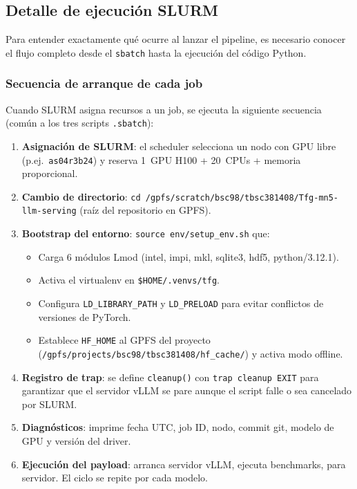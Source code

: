 \documentclass[11pt,a4paper]{article}
\begin{document}
\subsection{Detalle de ejecuci\'on SLURM}
\label{sec:slurm-detail}

Para entender exactamente qu\'e ocurre al lanzar el pipeline, es
necesario conocer el flujo completo desde el \texttt{sbatch} hasta la
ejecuci\'on del c\'odigo Python.

\subsubsection{Secuencia de arranque de cada job}

Cuando SLURM asigna recursos a un job, se ejecuta la siguiente
secuencia (com\'un a los tres scripts \texttt{.sbatch}):

\begin{enumerate}
  \item \textbf{Asignaci\'on de SLURM}: el scheduler selecciona un nodo
    con GPU libre (p.ej.~\texttt{as04r3b24}) y reserva 1~GPU H100 +
    20~CPUs + memoria proporcional.
  \item \textbf{Cambio de directorio}: \texttt{cd /gpfs/scratch/bsc98/\-tbsc381408/\-Tfg-mn5-llm-serving} (ra\'iz del repositorio en GPFS).
  \item \textbf{Bootstrap del entorno}: \texttt{source env/setup\_env.sh}
    que:
    \begin{itemize}
      \item Carga 6 m\'odulos Lmod (intel, impi, mkl, sqlite3, hdf5,
        python/3.12.1).
      \item Activa el virtualenv en \texttt{\$HOME/.venvs/tfg}.
      \item Configura \texttt{LD\_LIBRARY\_PATH} y \texttt{LD\_PRELOAD}
        para evitar conflictos de versiones de PyTorch.
      \item Establece \texttt{HF\_HOME} al GPFS del proyecto
        (\texttt{/gpfs/projects/bsc98/tbsc381408/hf\_cache/}) y activa
        modo offline.
    \end{itemize}
  \item \textbf{Registro de trap}: se define \texttt{cleanup()} con
    \texttt{trap cleanup EXIT} para garantizar que el servidor vLLM se
    pare aunque el script falle o sea cancelado por SLURM.
  \item \textbf{Diagn\'osticos}: imprime fecha UTC, job ID, nodo,
    commit git, modelo de GPU y versi\'on del driver.
  \item \textbf{Ejecuci\'on del payload}: arranca servidor vLLM,
    ejecuta benchmarks, para servidor. El ciclo se repite por cada
    modelo.
\end{enumerate}
\end{document}
